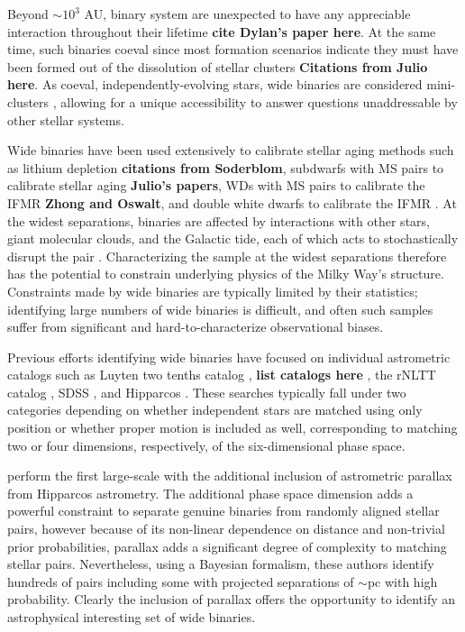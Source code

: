 \documentclass[usenatbib]{mnras}
\begin{document}
Beyond $\sim10^3$ AU, binary system are unexpected to have any appreciable interaction throughout their lifetime {\bf cite Dylan's paper here}. At the same time, such binaries coeval since most formation scenarios indicate they must have been formed out of the dissolution of stellar clusters {\bf Citations from Julio here}. As coeval, independently-evolving stars, wide binaries are considered mini-clusters \citep{soderblom10}, allowing for a unique accessibility to answer questions unaddressable by other stellar systems.


Wide binaries have been used extensively to calibrate stellar aging methods such as lithium depletion {\bf citations from Soderblom}, subdwarfs with MS pairs to calibrate stellar aging {\bf Julio's papers}, WDs with MS pairs to calibrate the IFMR {\bf Zhong and Oswalt}, and double white dwarfs to calibrate the IFMR \citep{finley97, andrews15}. At the widest separations, binaries are affected by interactions with other stars, giant molecular clouds, and the Galactic tide, each of which acts to stochastically disrupt the pair \citep{weinberg87, jiang10}. Characterizing the sample at the widest separations therefore has the potential to constrain underlying physics of the Milky Way's structure. Constraints made by wide binaries are typically limited by their statistics; identifying large numbers of wide binaries is difficult, and often such samples suffer from significant and hard-to-characterize observational biases.


Previous efforts identifying wide binaries have focused on individual astrometric catalogs such as Luyten two tenths catalog \citep{luyten79}, {\bf list catalogs here} \citep{bahcall81, gould95, wasserman91}, the rNLTT catalog \citep{chaname04}, SDSS \citep{dhital10, dhital15, longhitano10, andrews12, baxter14, andrews15}, and Hipparcos \citep{shaya11}. These searches typically fall under two categories depending on whether independent stars are matched using only position or whether proper motion is included as well, corresponding to matching two or four dimensions, respectively, of the six-dimensional phase space. 


\citep{shaya11} perform the first large-scale with the additional inclusion of astrometric parallax from Hipparcos astrometry. The additional phase space dimension adds a powerful constraint to separate genuine binaries from randomly aligned stellar pairs, however because of its non-linear dependence on distance and non-trivial prior probabilities, parallax adds a significant degree of complexity to matching stellar pairs. Nevertheless, using a Bayesian formalism, these authors identify hundreds of pairs including some with projected separations of $\sim$pc with high probability. Clearly the inclusion of parallax offers the opportunity to identify an astrophysical interesting set of wide binaries.
\end{document}
